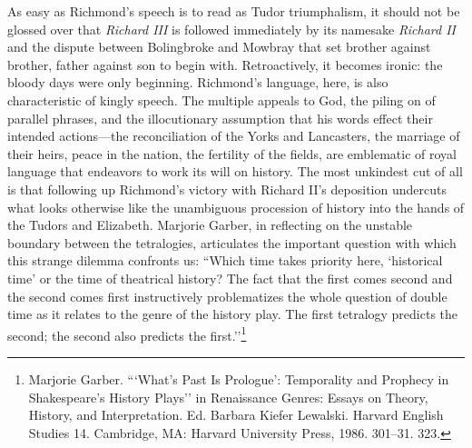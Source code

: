 As easy as Richmond’s speech is to read as Tudor triumphalism, it should not be glossed over that \emph{Richard III} is followed immediately by its namesake \emph{Richard II} and the dispute between Bolingbroke and Mowbray that set brother against brother, father against son to begin with.
Retroactively, it becomes ironic: the bloody days were only beginning.
Richmond’s language, here, is also characteristic of kingly speech.
The multiple appeals to God, the piling on of parallel phrases, and the illocutionary assumption that his words effect their intended actions---the reconciliation of the Yorks and Lancasters, the marriage of their heirs, peace in the nation, the fertility of the fields, are emblematic of royal language that endeavors to work its will on history.
The most unkindest cut of all is that following up Richmond’s victory with Richard II’s deposition undercuts what looks otherwise like the unambiguous procession of history into the hands of the Tudors and Elizabeth.
Marjorie Garber, in reflecting on the unstable boundary between the tetralogies, articulates the important question with which this strange dilemma confronts us: ``Which time takes priority here, ‘historical time’ or the time of theatrical history? The fact that the first comes second and the second comes first instructively problematizes the whole question of double time as it relates to the genre of the history play.
The first tetralogy predicts the second; the second also predicts the first.’’\footnote{Marjorie Garber. ``‘What’s Past Is Prologue’: Temporality and Prophecy in Shakespeare’s History Plays’’ in Renaissance Genres: Essays on Theory, History, and Interpretation. Ed. Barbara Kiefer Lewalski. Harvard English Studies 14. Cambridge, MA: Harvard University Press, 1986. 301--31. 323.}

